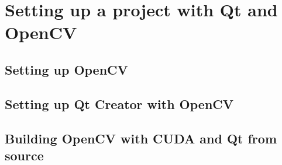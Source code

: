 \chapter{Setting up a project with Qt and OpenCV}

\section{Setting up OpenCV}

\section{Setting up Qt Creator with OpenCV}

\section{Building OpenCV with CUDA and Qt from source}